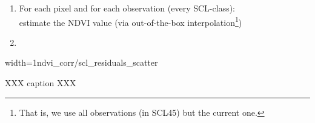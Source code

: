 {    \begin{enumerate}
        \item For each pixel and for each observation (every SCL-class):\\
            estimate the NDVI value (via out-of-the-box interpolation\footnote{That is, we use all observations (in SCL45) but the current one.})
        \item
    \end{enumerate}







    \begin{my_figure}[h]{width=1\textwidth}{ndvi_corr/scl_residuals_scatter}
        \caption{XXX caption XXX}
        \label{fig:ndvi_corr/scl_residuals_scatter}
    \end{my_figure}
}



